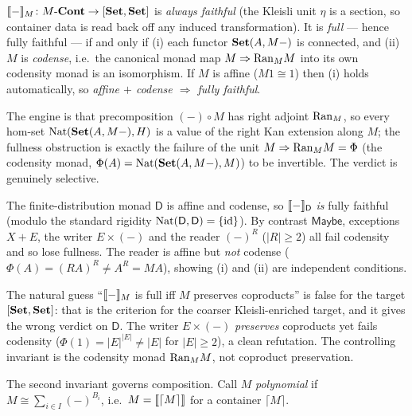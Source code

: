 \begin{theorem}[Faithful always; fullness $=$ codensity; \emph{peer-reviewed}]\label{thm:cob-codensity}
$\llbracket - \rrbracket_M\colon M\text{-}\mathbf{Cont}\to[\mathbf{Set},\mathbf{Set}]$ is \emph{always faithful}
(the Kleisli unit $\eta$ is a section, so container data is read back off any
induced transformation). It is \emph{full} --- hence fully faithful --- if and
only if \textup{(i)} each functor $\mathbf{Set}(A,M{-})$ is connected, and \textup{(ii)}
$M$ is \emph{codense}, i.e.\ the canonical monad map $M\Rightarrow\mathrm{Ran}_M M$ into
its own codensity monad is an isomorphism.
If $M$ is affine ($M1\cong1$) then \textup{(i)} holds automatically, so
\emph{affine $+$ codense $\Rightarrow$ fully faithful}.
\end{theorem}

The engine is that precomposition $(-)\circ M$ has right adjoint $\mathrm{Ran}_M$, so
every hom-set $\mathrm{Nat}(\mathbf{Set}(A,M{-}),H)$ is a value of the right Kan extension along
$M$; the fullness obstruction is exactly the failure of the unit
$M\Rightarrow\mathrm{Ran}_M M=\Phi$ (the codensity monad, $\Phi(A)=\mathrm{Nat}(\mathbf{Set}(A,M{-}),M)$)
to be invertible. The verdict is genuinely selective.

\begin{example}\label{ex:cob-effects}
The finite-distribution monad $\mathsf{D}$ is affine and codense, so
$\llbracket - \rrbracket_{\mathsf{D}}$ \emph{is} fully faithful (modulo the standard rigidity
$\mathrm{Nat}(\mathsf{D},\mathsf{D})=\{\mathrm{id}\}$). By contrast $\mathsf{Maybe}$, exceptions $X+E$, the writer
$E\times(-)$ and the reader $(-)^R$ ($|R|\ge2$) all fail codensity and so lose
fullness. The reader is affine but \emph{not} codense
($\Phi(A)=(RA)^R\neq A^R=MA$), showing (i) and (ii) are independent conditions.
\end{example}

\begin{remark}\label{rem:cob-wrongcrit}
The natural guess ``$\llbracket - \rrbracket_M$ is full iff $M$ preserves coproducts'' is false
for the target $[\mathbf{Set},\mathbf{Set}]$: that is the criterion for the coarser
Kleisli-enriched target, and it gives the wrong verdict on $\mathsf{D}$. The writer
$E\times(-)$ \emph{preserves} coproducts yet fails codensity
($\Phi(1)=|E|^{|E|}\neq|E|$ for $|E|\ge2$), a clean refutation. The controlling
invariant is the codensity monad $\mathrm{Ran}_M M$, not coproduct preservation.
\end{remark}

The second invariant governs composition. Call $M$ \emph{polynomial} if
$M\cong\sum_{i\in I}(-)^{B_i}$, i.e.\ $M=\llbracket \lceil M\rceil \rrbracket$ for a container
$\lceil M\rceil$.


